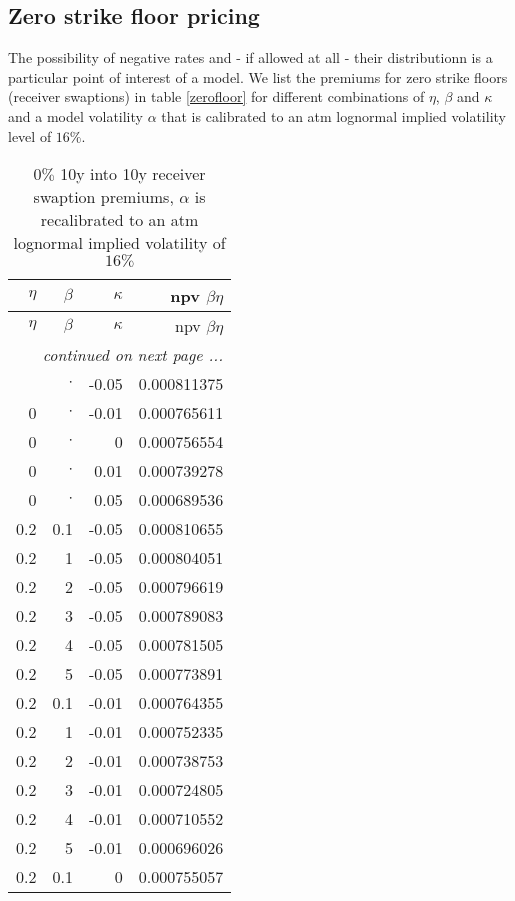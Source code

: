 \documentclass{amsart}
\theoremstyle{plain}
\numberwithin{equation}{section}
\begin{document}
\subsection{Zero strike floor pricing}

The possibility of negative rates and - if allowed at all - their distributionn is a particular point of interest of a model. We list the premiums for zero strike floors (receiver swaptions) in table \ref{zerofloor} for different combinations of $\eta$, $\beta$ and $\kappa$ and a model volatility $\alpha$ that is calibrated to an atm lognormal implied volatility level of $16\%$.

\begin{longtable}{r | r | r | r}
\caption{$0\%$ 10y into 10y receiver swaption premiums, $\alpha$ is recalibrated to an atm lognormal implied volatility of $16\%$} \\
$\eta$ & $\beta$ & $\kappa$ & npv $\beta\eta$ \\ \hline
\endfirsthead
$\eta$ & $\beta$ & $\kappa$ & npv $\beta\eta$ \\ \hline
\endhead
\multicolumn{4}{r}{\textit{continued on next page ...}} \\
\endfoot
\endlastfoot
0 & $\cdot$ & -0.05 & 0.000811375 \\ \hline 
0 & $\cdot$ & -0.01 & 0.000765611 \\ \hline
0 & $\cdot$ & 0 & 0.000756554 \\ \hline
0 & $\cdot$ & 0.01 & 0.000739278 \\ \hline
0 & $\cdot$ & 0.05 & 0.000689536 \\ \hline
0.2 & 0.1 & -0.05 & 0.000810655 \\ 
0.2 & 1 & -0.05 & 0.000804051 \\ 
0.2 & 2 & -0.05 & 0.000796619 \\ 
0.2 & 3 & -0.05 & 0.000789083 \\ 
0.2 & 4 & -0.05 & 0.000781505 \\ 
0.2 & 5 & -0.05 & 0.000773891 \\ \hline
0.2 & 0.1 & -0.01 & 0.000764355 \\ 
0.2 & 1 & -0.01 & 0.000752335 \\ 
0.2 & 2 & -0.01 & 0.000738753 \\ 
0.2 & 3 & -0.01 & 0.000724805 \\ 
0.2 & 4 & -0.01 & 0.000710552 \\ 
0.2 & 5 & -0.01 & 0.000696026 \\ \hline
0.2 & 0.1 & 0 & 0.000755057 \\ 

\end{longtable}
\end{document}
